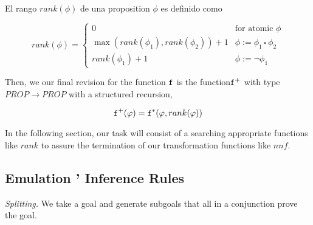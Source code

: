 \documentclass[../main.tex]{subfiles}
\begin{document}
\begin{definition}
El rango $rank(\phi)$ de una proposition $\phi$ es definido como

\begin{equation}
\label{eq:rank-definition}
rank(\phi)=
\begin{cases}
0 &\text{for atomic }\phi\\

\max(rank(\phi_1),rank(\phi_2)) + 1
  & \phi := \phi_1\,\square\, \phi_2 \\
rank(\phi_1) + 1  & \phi := \neg \phi_1
\end{cases}
\end{equation}

\end{definition}

Then, we our final revision for the function $\texttt{f}$ is the
function$\texttt{f}^{+}$ with type $PROP \to PROP$
with a structured recursion,

\begin{equation}
\texttt{f}^{+}(\varphi) = \texttt{f}^{*}(\varphi, rank(\varphi))
\end{equation}

In the following section, our task will consist of a searching
appropriate functions like $rank$ to assure the termination of
our transformation functions like $nnf$.



\subsection{Emulation \Metis' Inference Rules}

\emph{Splitting.}
We take a goal and generate subgoals that all in a conjunction
prove the goal.
\end{document}
